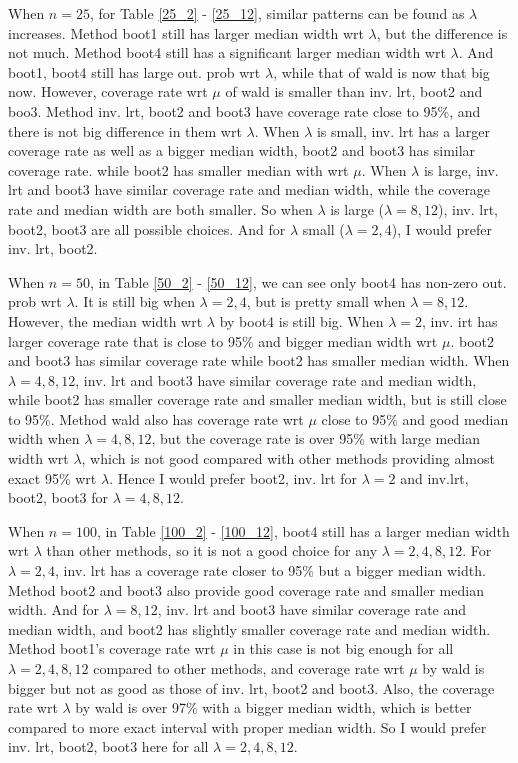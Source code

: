 \documentclass{article}
\begin{document}
	When $n = 25$, for Table \ref{25_2} - \ref{25_12}, similar patterns can be found as $\lambda$ increases. Method boot1 still has larger median width wrt $\lambda$, but the difference is not much. Method boot4 still has a significant larger median width wrt $\lambda$. And boot1, boot4 still has large out. prob wrt $\lambda$, while that of wald is now that big now. However, coverage rate wrt $\mu$ of wald is smaller than inv. lrt, boot2 and boo3. Method inv. lrt, boot2 and boot3 have coverage rate close to 95\%, and there is not big difference in them wrt $\lambda$. When $\lambda$ is small, inv. lrt has a larger coverage rate as well as a bigger median width, boot2 and boot3 has similar coverage rate. while boot2 has smaller median with wrt $\mu$. When $\lambda$ is large, inv. lrt and boot3 have similar coverage rate and median width, while the coverage rate and median width are both smaller. So when $\lambda$ is large ($\lambda = 8, 12$), inv. lrt, boot2, boot3 are all possible choices. And for $\lambda$ small ($\lambda = 2, 4$), I would prefer inv. lrt, boot2.

	When $n = 50$, in Table \ref{50_2} - \ref{50_12}, we can see only boot4 has non-zero out. prob wrt $\lambda$. It is still big when $\lambda = 2, 4$, but is pretty small when $\lambda = 8, 12$. However, the median width wrt $\lambda$ by boot4 is still big. When $\lambda = 2$, inv. irt has larger coverage rate that is close to 95\% and bigger median width wrt $\mu$. boot2 and boot3 has similar coverage rate while boot2 has smaller median width. When $\lambda = 4, 8, 12$, inv. lrt and boot3 have similar coverage rate and median width, while boot2 has smaller coverage rate and smaller median width, but is still close to 95\%. Method wald also has coverage rate wrt $\mu$ close to 95\% and good median width when $\lambda = 4, 8, 12$, but the coverage rate is over 95\% with large median width wrt $\lambda$, which is not good compared with other methods providing almost exact 95\% wrt $\lambda$. Hence I would prefer boot2, inv. lrt for $\lambda =2$ and inv.lrt, boot2, boot3 for $\lambda = 4, 8, 12$. 

	When $n = 100$, in Table \ref{100_2} - \ref{100_12}, boot4 still has a larger median width wrt $\lambda$ than other methods, so it is not a good choice for any $\lambda = 2, 4, 8, 12.$ For $\lambda = 2, 4$, inv. lrt has a coverage rate closer to 95\% but a bigger median width. Method boot2 and boot3 also provide good coverage rate and smaller median width.  And for $\lambda = 8 ,12$, inv. lrt and boot3 have similar coverage rate and median width, and boot2 has slightly smaller coverage rate and median width. Method boot1's coverage rate wrt $\mu$ in this case is not big enough for all $\lambda = 2, 4, 8, 12$ compared to other methods, and coverage rate wrt $\mu$ by wald is bigger but not as good as those of inv. lrt, boot2 and boot3. Also, the coverage rate wrt $\lambda$ by wald is over 97\% with a bigger median width, which is better compared to more exact interval with proper median width. So I would prefer inv. lrt, boot2, boot3 here for all $\lambda = 2, 4, 8, 12$. 
\end{document}
